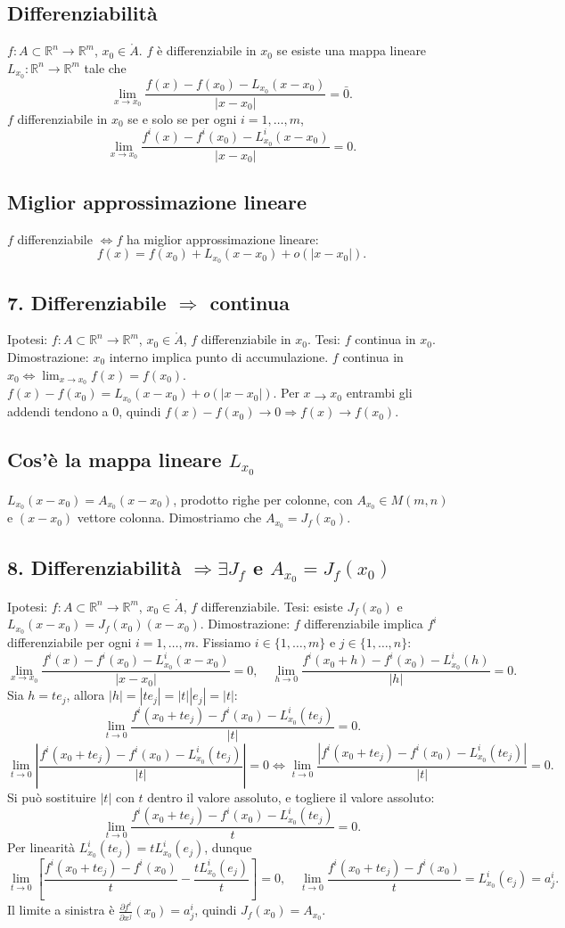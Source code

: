 \documentclass[11pt,a4paper]{article}
\newcommand{\R}{\mathbb R}\newcommand{\N}{\mathbb N}\newcommand{\pagina}[1]{\clearpage}
\begin{document}
\subsection*{Differenziabilità}
$f:A\subset\R^n\to\R^m$, $x_0\in\mathring A$. $f$ è differenziabile in $x_0$ se esiste una mappa lineare $L_{x_0}:\R^n\to\R^m$ tale che
\[\lim_{x\to x_0}\frac{f(x)-f(x_0)-L_{x_0}(x-x_0)}{|x-x_0|}=\bar0.\]
\pagina{21}
$f$ differenziabile in $x_0$ se e solo se per ogni $i=1,\ldots,m$,
\[\lim_{x\to x_0}\frac{f^i(x)-f^i(x_0)-L_{x_0}^i(x-x_0)}{|x-x_0|}=0.\]
\subsection*{Miglior approssimazione lineare}
$f$ differenziabile $\iff f$ ha miglior approssimazione lineare:
\[f(x)=f(x_0)+L_{x_0}(x-x_0)+o(|x-x_0|).\]
\subsection*{7. Differenziabile $\Rightarrow$ continua}
Ipotesi: $f:A\subset\R^n\to\R^m$, $x_0\in\mathring A$, $f$ differenziabile in $x_0$. Tesi: $f$ continua in $x_0$.
Dimostrazione: $x_0$ interno implica punto di accumulazione. $f$ continua in $x_0\iff\lim_{x\to x_0}f(x)=f(x_0)$.
$f(x)-f(x_0)=L_{x_0}(x-x_0)+o(|x-x_0|)$.
Per $x\to x_0$ entrambi gli addendi tendono a $0$, quindi $f(x)-f(x_0)\to0\Rightarrow f(x)\to f(x_0)$.
\subsection*{Cos'è la mappa lineare $L_{x_0}$}
$L_{x_0}(x-x_0)=A_{x_0}(x-x_0)$, prodotto righe per colonne, con $A_{x_0}\in M(m,n)$ e $(x-x_0)$ vettore colonna. Dimostriamo che $A_{x_0}=J_f(x_0)$.

\pagina{22}
\subsection*{8. Differenziabilità $\Rightarrow\exists J_f$ e $A_{x_0}=J_f(x_0)$}
Ipotesi: $f:A\subset\R^n\to\R^m$, $x_0\in\mathring A$, $f$ differenziabile. Tesi: esiste $J_f(x_0)$ e $L_{x_0}(x-x_0)=J_f(x_0)(x-x_0)$.
Dimostrazione: $f$ differenziabile implica $f^i$ differenziabile per ogni $i=1,\ldots,m$. Fissiamo $i\in\{1,\ldots,m\}$ e $j\in\{1,\ldots,n\}$:
\[\lim_{x\to x_0}\frac{f^i(x)-f^i(x_0)-L^i_{x_0}(x-x_0)}{|x-x_0|}=0,\quad\lim_{h\to0}\frac{f^i(x_0+h)-f^i(x_0)-L^i_{x_0}(h)}{|h|}=0.\]
Sia $h=te_j$, allora $|h|=|te_j|=|t||e_j|=|t|$:
\[\lim_{t\to0}\frac{f^i(x_0+te_j)-f^i(x_0)-L^i_{x_0}(te_j)}{|t|}=0.\]
\[\lim_{t\to0}\left|\frac{f^i(x_0+te_j)-f^i(x_0)-L^i_{x_0}(te_j)}{|t|}\right|=0
\iff\lim_{t\to0}\frac{|f^i(x_0+te_j)-f^i(x_0)-L^i_{x_0}(te_j)|}{|t|}=0.\]
Si può sostituire $|t|$ con $t$ dentro il valore assoluto, e togliere il valore assoluto:
\[\lim_{t\to0}\frac{f^i(x_0+te_j)-f^i(x_0)-L^i_{x_0}(te_j)}t=0.\]
Per linearità $L^i_{x_0}(te_j)=tL^i_{x_0}(e_j)$, dunque
\[\lim_{t\to0}\left[\frac{f^i(x_0+te_j)-f^i(x_0)}t-\frac{tL^i_{x_0}(e_j)}t\right]=0,
\quad\lim_{t\to0}\frac{f^i(x_0+te_j)-f^i(x_0)}t=L^i_{x_0}(e_j)=a^i_j.\]
Il limite a sinistra è $\frac{\partial f^i}{\partial x^j}(x_0)=a^i_j$, quindi $J_f(x_0)=A_{x_0}$.
\pagina{23}
\end{document}
